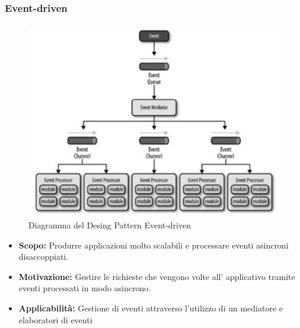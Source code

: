 \documentclass[a4paper]{article}
\begin{document}
	\subsubsection{Event-driven}
				\begin{figure}[H]
					\centering
					\includegraphics[scale=0.65]{immagini/ST/schemaevent-driven.jpg}
					\caption{Diagramma del Desing Pattern Event-driven}
				\end{figure}
            \begin{itemize}
				\item \textbf{Scopo:}
					Produrre applicazioni molto scalabili e processare eventi asincroni disaccoppiati.
                \item \textbf{Motivazione:} Gestire le richieste che vengono volte all' applicativo tramite eventi processati in modo asincrono.
                \item \textbf{Applicabilità:}
                	Gestione di eventi attraverso l'utilizzo di un mediatore e elaboratori di eventi		
			\end{itemize}
\end{document}
